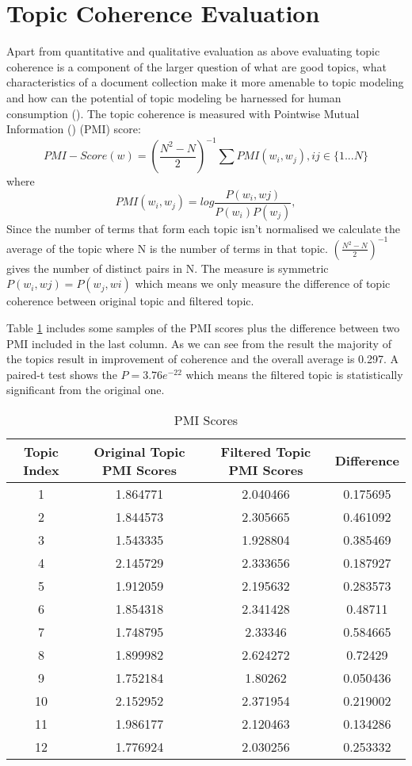 \documentclass[11pt,twoside]{report}
\begin{document}
\section{Topic Coherence Evaluation}
Apart from quantitative and qualitative evaluation as above evaluating topic coherence is a component of the larger question of what are good topics, what characteristics of a document collection make it more amenable to topic modeling and how can the potential of topic modeling be harnessed for human consumption (\cite{ref27}). The topic coherence is measured with Pointwise Mutual Information (\cite{ref32}) (PMI) score:
\begin{equation}
PMI-Score(w) = (\frac{N^{2}-N}{2})^{-1}\sum PMI(w_{i}, w_{j}), ij\in \{1...N\}
\end{equation}
where
\begin{equation}
PMI(w_{i}, w_{j}) = log \frac{P(w_{i}, w{j})}{P(w_{i})P(w_{j})},
\end{equation}
Since the number of terms that form each topic isn't normalised we calculate the average of the topic where N is the number of terms in that topic. $(\frac{N^{2}-N}{2})^{-1}$ gives the number of distinct pairs in N.
The measure is symmetric $P(w_{i}, w{j}) = P(w_{j}, w{i})$ which means we only measure the difference of topic coherence between original topic and filtered topic.

Table \ref{table:PMIScores} includes some samples of the PMI scores plus the difference between two PMI included in the last column. As we can see from the result the majority of the topics result in improvement of coherence and the overall average is 0.297. A paired-t test shows the $P=3.76e^{-22}$ which means the filtered topic is statistically significant from the original one.

\begin{table}[h]
\caption{PMI Scores}
\centering
\begin{tabular}{c c c c}
\hline\hline
Topic Index & Original Topic PMI Scores & Filtered Topic PMI Scores & Difference\\
\hline
1 & 1.864771 & 2.040466 & 0.175695\\
2 & 1.844573 & 2.305665 & 0.461092\\
3 & 1.543335 & 1.928804 & 0.385469\\
4 & 2.145729 & 2.333656 & 0.187927\\
5 & 1.912059 & 2.195632 & 0.283573\\
6 & 1.854318 & 2.341428 & 0.48711\\
7 & 1.748795 & 2.33346 & 0.584665\\
8 & 1.899982 & 2.624272 & 0.72429\\
9 & 1.752184 & 1.80262 & 0.050436\\
10 & 2.152952 & 2.371954 & 0.219002\\
11 & 1.986177 & 2.120463 & 0.134286\\
12 & 1.776924 & 2.030256 & 0.253332\\
\hline
\end{tabular}
\label{table:PMIScores}
\end{table}
\end{document}

